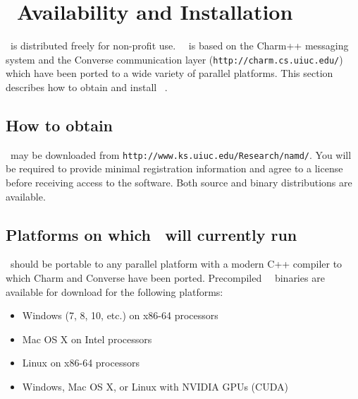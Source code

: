 
\section{\NAMD\ Availability and Installation}
\label{section:avail}

\NAMD\ is distributed freely for non-profit use.
\NAMD\ \NAMDVER\ is based on the Charm++ messaging system and the
Converse communication layer ({\tt http://charm.cs.uiuc.edu/})
which have been ported to a wide variety of parallel platforms.
This section describes how to obtain and install \NAMD\ \NAMDVER.

\subsection{How to obtain \NAMD}

\NAMD\ may be downloaded from {\tt http://www.ks.uiuc.edu/Research/namd/}.
You will be required to provide minimal registration information and
agree to a license before receiving access to the software.
Both source and binary distributions are available.

\subsection{Platforms on which \NAMD\ will currently run}
\NAMD\ should be portable to any parallel platform with a
modern C++ compiler to which Charm and Converse have been ported.
Precompiled \NAMD\ \NAMDVER\ binaries are available for
download for the following platforms:  

\begin{itemize}
\item Windows (7, 8, 10, etc.) on x86-64 processors
\item Mac OS X on Intel processors
\item Linux on x86-64 processors
\item Windows, Mac OS X, or Linux with NVIDIA GPUs (CUDA)
\end{itemize}

